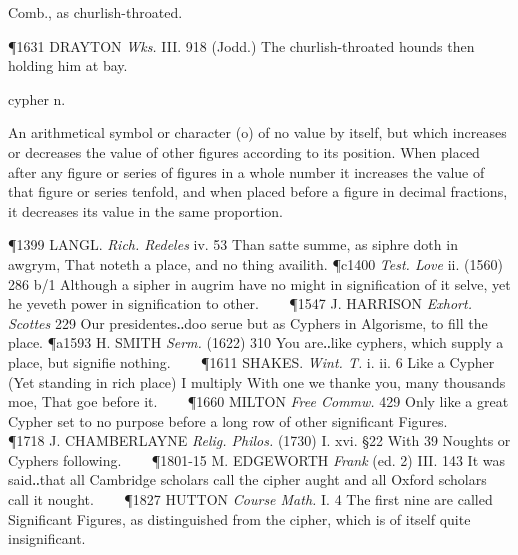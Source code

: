 \begin{description}[wide, labelwidth=!, labelindent=0pt]
\begin{myenumerate}
 Comb., as churlish-throated.

\P 1631 DRAYTON  \textit{Wks.} III. 918 (Jodd.) The churlish-throated hounds then holding him at bay.
\end{myenumerate}


 cypher n.

\noindent {}

\noindent [a. OF. cyfre, cyffre (mod.F. chiffre) = Sp. Pg. It. cifra, med.L. cifra, cifera, ciphra, f. Arab. çifr the arithmetical symbol ‘zero’ or ‘nought’ (written in Indian and Arabic numeration \phonetic{٠}), a subst. use of the adj. çifr ‘empty, void’, f. çafara to be empty. The Arabic was simply a translation of the Sanscrit name śūnya, literally ‘empty’.]
\vspace{-0.3cm}

\begin{myenumerate}

 An arithmetical symbol or character (o) of no value by itself, but which increases or decreases the value of other figures according to its position. When placed after any figure or series of figures in a whole number it increases the value of that figure or series tenfold, and when placed before a figure in decimal fractions, it decreases its value in the same proportion.

\P 1399 LANGL.  \textit{Rich. Redeles} iv. 53 Than satte summe, as siphre doth in awgrym, That noteth a place, and no thing availith.
\P c1400 \textit{Test.  Love} ii. (1560) 286 b/1 Although a sipher in augrim have no might in signification of it selve, yet he yeveth power in signification to other.    
\P 1547 J. HARRISON  \textit{Exhort. Scottes} 229 Our presidentes‥doo serue but as Cyphers in Algorisme, to fill the place.
\P a1593 H. SMITH  \textit{Serm.} (1622) 310 You are‥like cyphers, which supply a place, but signifie nothing.    
\P 1611 SHAKES.  \textit{Wint. T.} i. ii. 6 Like a Cypher (Yet standing in rich place) I multiply With one we thanke you, many thousands moe, That goe before it.    
\P 1660 MILTON  \textit{Free Commw.} 429 Only like a great Cypher set to no purpose before a long row of other significant Figures.    
\P 1718 J. CHAMBERLAYNE  \textit{Relig. Philos.} (1730) I. xvi. §22 With 39 Noughts or Cyphers following.    
\P 1801-15 M. EDGEWORTH  \textit{Frank} (ed. 2) III. 143 It was said‥that all Cambridge scholars call the cipher aught and all Oxford scholars call it nought.    
\P 1827 HUTTON  \textit{Course Math.} I. 4 The first nine are called Significant Figures, as distinguished from the cipher, which is of itself quite insignificant.


\end{myenumerate}
\end{description}
